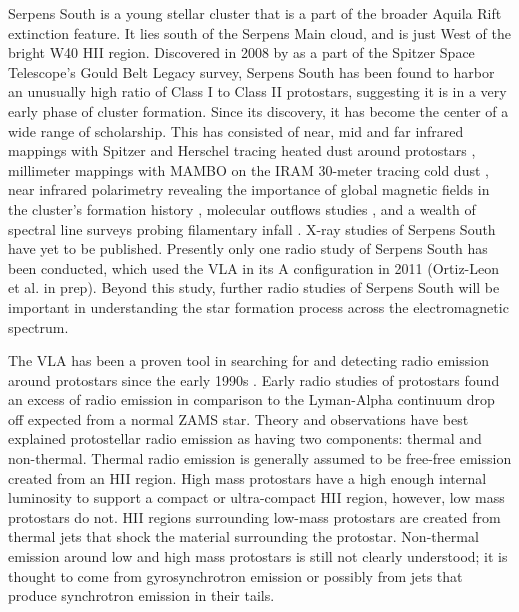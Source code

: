 \documentclass[apj]{emulateapj}
\begin{document}
	Serpens South is a young stellar cluster that is a part of the broader Aquila Rift extinction feature. It lies south of the Serpens Main cloud, and is just West of the bright W40 HII region. Discovered in 2008 by \citet{Gutermuth08} as a part of the Spitzer Space Telescope's Gould Belt Legacy survey, Serpens South has been found to harbor an unusually high ratio of Class I to Class II protostars, suggesting it is in a very early phase of cluster formation. Since its discovery, it has become the center of a wide range of scholarship. This has consisted of near, mid and far infrared mappings with Spitzer and Herschel tracing heated dust around protostars \citep{Gutermuth08, Bontemps10}, millimeter mappings with MAMBO on the IRAM 30-meter tracing cold dust \citep{Maury11}, near infrared polarimetry revealing the importance of global magnetic fields in the cluster's formation history \citep{Sugitani11}, molecular outflows studies \citep{Nakamura11, Teixeira12}, and a wealth of spectral line surveys probing filamentary infall \citep{Kirk13, Friesen13, Tanaka13, FernandezLopez14,Nakamura14a}. X-ray studies of Serpens South have yet to be published. Presently only one radio study of Serpens South has been conducted, which used the VLA in its A configuration in 2011 (Ortiz-Leon et al. in prep). Beyond this study, further radio studies of Serpens South will be important in understanding the star formation process across the electromagnetic spectrum. 
	 
	 
	The VLA has been a proven tool in searching for and detecting radio emission around protostars since the early 1990s \citep[e.g.,][]{Curiel89, Anglada98, Reipurth99, Beltran01, Eiroa05, Shirley07, Rodriguez10}. Early radio studies of protostars found an excess of radio emission in comparison to the Lyman-Alpha continuum drop off expected from a normal ZAMS star. Theory and observations have best explained protostellar radio emission as having two components: thermal and non-thermal. Thermal radio emission is generally assumed to be free-free emission created from an HII region. High mass protostars have a high enough internal luminosity to support a compact or ultra-compact HII region, however, low mass protostars do not. HII regions surrounding low-mass protostars are created from thermal jets that shock the material surrounding the protostar. Non-thermal emission around low and high mass protostars is still not clearly understood; it is thought to come from gyrosynchrotron emission or possibly from jets that produce synchrotron emission in their tails. 
	
\end{document}
